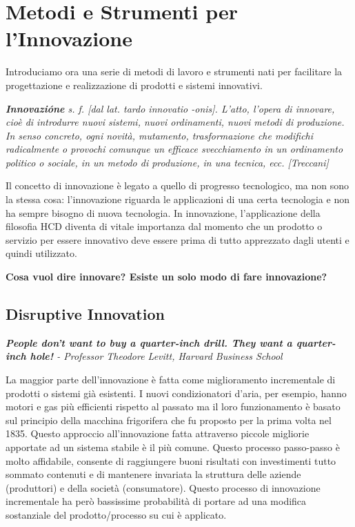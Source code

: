 \chapter{Metodi e Strumenti per l'Innovazione}

Introduciamo ora una serie di metodi di lavoro e strumenti nati per facilitare la progettazione e realizzazione di prodotti e sistemi innovativi. 

\begin{flushleft}
\textit{ \textbf{Innovazióne} s. f. [dal lat. tardo innovatio -onis]. L’atto, l’opera di innovare, cioè di introdurre nuovi sistemi, nuovi ordinamenti,
nuovi metodi di produzione. In senso concreto, ogni novità, mutamento, trasformazione che modifichi radicalmente o provochi comunque un efficace
svecchiamento in un ordinamento politico o sociale, in un metodo di produzione, in una tecnica, ecc. [Treccani]}
\end{flushleft}

Il concetto di innovazione è legato a quello di progresso tecnologico, ma non sono la stessa cosa: l'innovazione riguarda le applicazioni di una certa
tecnologia e non ha sempre bisogno di nuova tecnologia.
In innovazione, l'applicazione della filosofia HCD diventa di vitale importanza dal momento che un prodotto o servizio per essere innovativo deve
essere prima di tutto apprezzato dagli utenti e quindi utilizzato.

\textbf{Cosa vuol dire innovare? Esiste un solo modo di fare innovazione?}

\section{Disruptive Innovation}
\begin{flushleft}
	\textit{\textbf{People don’t want to buy a quarter-inch drill. They want a quarter-inch hole!} - Professor Theodore Levitt,
	Harvard Business School}
\end{flushleft}

La maggior parte dell'innovazione è fatta come miglioramento incrementale di prodotti o sistemi già esistenti. I nuovi condizionatori d'aria, per
esempio, hanno motori e gas più efficienti rispetto al passato ma il loro funzionamento è basato sul principio della macchina frigorifera che fu
proposto per la prima volta nel 1835.
Questo approccio all'innovazione fatta attraverso piccole migliorie apportate ad un sistema stabile è il più comune. Questo processo passo-passo è
molto affidabile, consente di raggiungere buoni risultati con investimenti tutto sommato contenuti e di mantenere invariata la struttura delle aziende
(produttori) e della società (consumatore). Questo processo di innovazione incrementale ha però bassissime probabilità di portare ad una modifica
sostanziale del prodotto/processo su cui è applicato.


